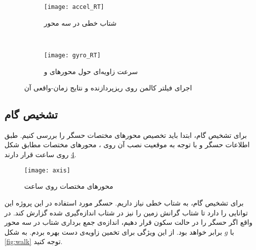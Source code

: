 \begin{figure}[h]
	\centering
	\begin{subfigure}{0.8\textwidth}
		\centering
		\texttt{[image: accel\_RT]}
		\caption{شتاب خطی در سه محور}
		\label{fig:kalan-result-accel}
	\end{subfigure} \\
	\begin{subfigure}{\textwidth}
		\centering
		\texttt{[image: gyro\_RT]}
		\caption{سرعت زاویه‌ای حول محورهای  و }
		\label{fig:kalan-result-gyro}
	\end{subfigure}
	\caption{اجرای فیلتر کالمن روی ریزپردازنده و نتایج زمان-واقعی آن}
\end{figure}

\subsection{تشخیص گام}
برای تشخیص گام، ابتدا باید تخصیص محورهای مختصات حسگر را بررسی کنیم. طبق اطلاعات حسگر و با توجه به موقعیت نصب آن روی \pcbf، محورهای مختصات مطابق شکل \ref{fig:axis} روی ساعت قرار دارند.

\begin{figure}[h]
	\centering
	\texttt{[image: axis]}
	\caption{محورهای مختصات روی ساعت}
	\label{fig:axis}
\end{figure}

برای تشخیص گام، به شتاب خطی نیاز داریم. حسگر مورد استفاده در این پروژه این توانایی را دارد تا شتاب گرانش زمین را نیز در شتاب اندازه‌گیری شده گزارش کند. در واقع اگر حسگر را در حالت سکون قرار دهیم، اندازه‌ی جمع برداری شتاب در سه محور با $g$ برابر خواهد بود. از این ویژگی برای تخمین زاویه‌ی دست بهره بردم. به شکل \ref{fig:walk} توجه کنید.


